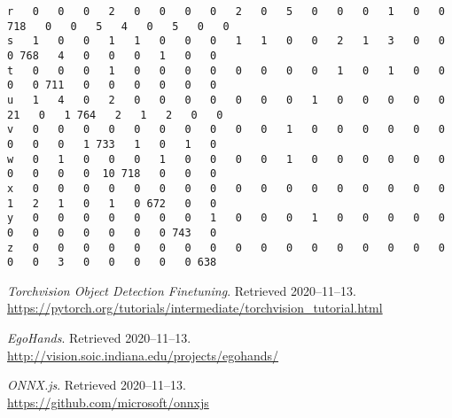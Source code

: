 \documentclass[12pt]{article}
\begin{document}
\begin{tiny}
\begin{verbatim}
r   0   0   0   2   0   0   0   0   2   0   5   0   0   0   1   0   0 718   0   0   5   4   0   5   0   0
s   1   0   0   1   1   0   0   0   1   1   0   0   2   1   3   0   0   0 768   4   0   0   0   1   0   0
t   0   0   0   1   0   0   0   0   0   0   0   0   1   0   1   0   0   0   0 711   0   0   0   0   0   0
u   1   4   0   2   0   0   0   0   0   0   0   1   0   0   0   0   0  21   0   1 764   2   1   2   0   0
v   0   0   0   0   0   0   0   0   0   0   1   0   0   0   0   0   0   0   0   0   1 733   1   0   1   0
w   0   1   0   0   0   1   0   0   0   0   1   0   0   0   0   0   0   0   0   0   0  10 718   0   0   0
x   0   0   0   0   0   0   0   0   0   0   0   0   0   0   0   0   0   1   2   1   0   1   0 672   0   0
y   0   0   0   0   0   0   0   1   0   0   0   1   0   0   0   0   0   0   0   0   0   0   0   0 743   0
z   0   0   0   0   0   0   0   0   0   0   0   0   0   0   0   0   0   0   0   3   0   0   0   0   0 638
\end{verbatim}
\end{tiny}

\begin{thebibliography}{1}
  \textit{Torchvision Object Detection Finetuning}. Retrieved
  2020--11--13.
  \\\url{https://pytorch.org/tutorials/intermediate/torchvision_tutorial.html}

  \textit{EgoHands}. Retrieved 2020--11--13.
  \\\url{http://vision.soic.indiana.edu/projects/egohands/}

  \textit{ONNX.js}. Retrieved 2020--11--13.
  \\\url{https://github.com/microsoft/onnxjs}
\end{thebibliography}
\end{document}
